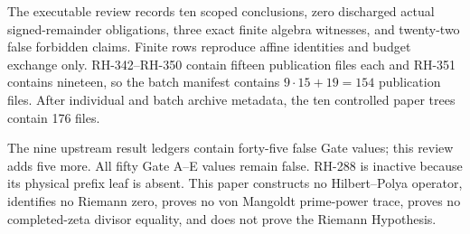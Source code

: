 \documentclass[11pt]{article}
\theoremstyle{definition}
\theoremstyle{remark}
\begin{document}
The executable review records ten scoped conclusions, zero discharged actual
signed-remainder obligations, three exact finite algebra witnesses, and
twenty-two false forbidden claims.  Finite rows reproduce affine identities
and budget exchange only.  RH-342--RH-350 contain fifteen publication files
each and RH-351 contains nineteen, so the batch manifest contains
$9\cdot15+19=154$ publication files.  After individual and batch archive
metadata, the ten controlled paper trees contain 176 files.

The nine upstream result ledgers contain forty-five false Gate values; this
review adds five more.  All fifty Gate A--E values remain false.  RH-288 is
inactive because its physical prefix leaf is absent.  This paper constructs
no Hilbert--Polya operator, identifies no Riemann zero, proves no von
Mangoldt prime-power trace, proves no completed-zeta divisor equality, and
does not prove the Riemann Hypothesis.



\end{document}
